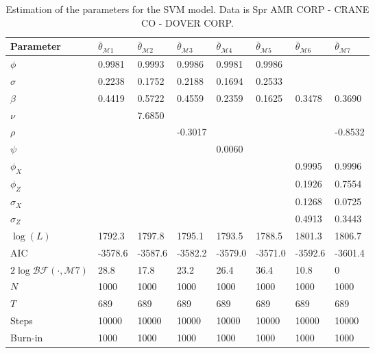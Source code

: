 \documentclass[11pt,a4,twosided,singlespacing,titlepagenumber=on]{scrreprt}
\numberwithin{equation}{chapter} %
\theoremstyle{remark}
\begin{document}
\begin{table}[H]
\centering
\begin{tabular}{llllllll}
Parameter        & $\bar{\theta}_{\mathcal{M}1}$ & $\bar{\theta}_{\mathcal{M}2}$ & $\bar{\theta}_{\mathcal{M}3}$ & $\bar{\theta}_{\mathcal{M}4}$ & $\bar{\theta}_{\mathcal{M}5}$ & $\bar{\theta}_{\mathcal{M}6}$& $\bar{\theta}_{\mathcal{M}7}$\\ 
\hline
$\phi$								                  & 0.9981  & 0.9993 & 0.9986  & 0.9981  & 0.9986 & \\
$\sigma$                                & 0.2238  & 0.1752 & 0.2188  & 0.1694  & 0.2533 & \\
$\beta$                                 & 0.4419  & 0.5722 & 0.4559  & 0.2359  & 0.1625 & 0.3478 & 0.3690\\
$\nu$                                   &         & 7.6850 &         &         &         &\\
$\rho$                                  &         &        & -0.3017 &         &         & & -0.8532\\
$\psi$                                  &         &        &         & 0.0060  &         & \\
$\phi_X$                                &         &        &         &         &         & 0.9995 & 0.9996\\
$\phi_Z$                                &         &        &         &         &         & 0.1926 & 0.7554\\
$\sigma_X$                              &         &        &         &         &         & 0.1268 & 0.0725\\
$\sigma_Z$                              &         &        &         &         &         & 0.4913 & 0.3443\\
$\log(L)$                               & 1792.3  & 1797.8 & 1795.1  & 1793.5  & 1788.5  & 1801.3 & 1806.7\\
AIC                                     & -3578.6 & -3587.6& -3582.2 & -3579.0 & -3571.0 & -3592.6 & -3601.4\\
$2 \log \mathcal{BF}(\cdot, \mathcal{M}7)$& 28.8    & 17.8      & 23.2    & 26.4    & 36.4    & 10.8 & 0 \\
$N$                                     & 1000    & 1000   & 1000    & 1000    & 1000    & 1000 & 1000\\
$T$                                     & 689     & 689    & 689     & 689     & 689     & 689 & 689\\
Steps                                   & 10000   & 10000  & 10000   & 10000   & 10000   & 10000& 10000\\
Burn-in                                 & 1000    & 1000   & 1000    & 1000    & 1000    & 1000 & 1000\\
\hline
\end{tabular}
\caption{Estimation of the parameters for the SVM model. Data is Spr AMR CORP - CRANE CO - DOVER CORP.}
\label{estimation_of_svm_appl_spr}
\end{table}
\end{document}
